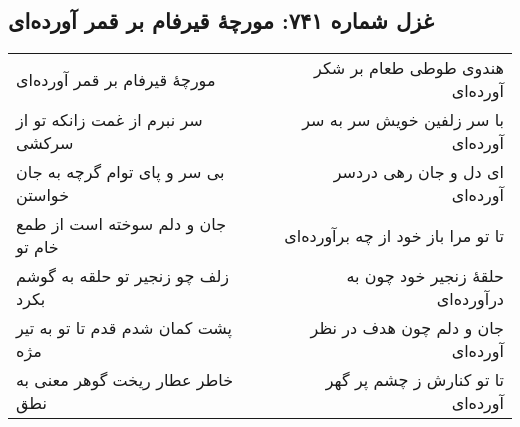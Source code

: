 \begin{center}
\section*{غزل شماره ۷۴۱: مورچهٔ قیرفام بر قمر آورده‌ای}
\label{sec:741}
\begin{longtable}{l p{0.5cm} r}
مورچهٔ قیرفام بر قمر آورده‌ای
&&
هندوی طوطی طعام بر شکر آورده‌ای
\\
سر نبرم از غمت زانکه تو از سرکشی
&&
با سر زلفین خویش سر به سر آورده‌ای
\\
بی سر و پای توام گرچه به جان خواستن
&&
ای دل و جان رهی دردسر آورده‌ای
\\
جان و دلم سوخته است از طمع خام تو
&&
تا تو مرا باز خود از چه برآورده‌ای
\\
زلف چو زنجیر تو حلقه به گوشم بکرد
&&
حلقهٔ زنجیر خود چون به درآورده‌ای
\\
پشت کمان شدم قدم تا تو به تیر مژه
&&
جان و دلم چون هدف در نظر آورده‌ای
\\
خاطر عطار ریخت گوهر معنی به نطق
&&
تا تو کنارش ز چشم پر گهر آورده‌ای
\\
\end{longtable}
\end{center}
